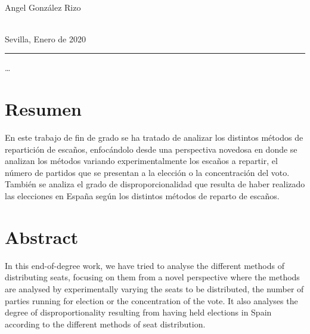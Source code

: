 \documentclass[12pt,a4paper,]{book}
\def\ifdoblecara{} %
\numberwithin{dummy}{section}
\theoremstyle{ocrenumbox}
\theoremstyle{blacknumex}
\theoremstyle{blacknumbox}
\theoremstyle{ocrenum}
\theoremstyle{ocrenum}
\begin{document}
\begin{titlepage}
\begin{minipage}{14cm}
\HRule \\[4cm]


{\Large

Angel González Rizo} \\[0.5cm]

{\large
Sevilla, Enero de 2020
}

\end{minipage}

\vfill %

\cleardoublepage
\thispagestyle{empty}
\end{titlepage}

\raggedbottom


\begin{center}\rule{0.5\linewidth}{0.5pt}\end{center}

\ldots{}

\setlength{\parindent}{1em}

\pagestyle{fancy}
\ifdefined\ifdoblecara
\fancyhead[LE,RO]{}
\fancyhead[LO,RE]{}
\else
\fancyhead[RO]{}
\fancyhead[LO]{}
\fi
\renewcommand{\headrulewidth}{0pt}
\renewcommand{\footrulewidth}{0pt}

\setcounter{tocdepth}{2}
\tableofcontents

\cleardoublepage

\section*{Resumen}

En este trabajo de fin de grado se ha tratado de analizar los distintos
métodos de repartición de escaños, enfocándolo desde una perspectiva
novedosa en donde se analizan los métodos variando experimentalmente los
escaños a repartir, el número de partidos que se presentan a la elección
o la concentración del voto. También se analiza el grado de
disproporcionalidad que resulta de haber realizado las elecciones en
España según los distintos métodos de reparto de escaños.

\clearpage
\section*{Abstract}

In this end-of-degree work, we have tried to analyse the different
methods of distributing seats, focusing on them from a novel perspective
where the methods are analysed by experimentally varying the seats to be
distributed, the number of parties running for election or the
concentration of the vote. It also analyses the degree of
disproportionality resulting from having held elections in Spain
according to the different methods of seat distribution.
\end{document}
